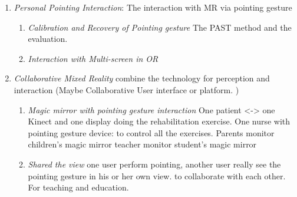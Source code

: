 \begin{enumerate}
	\item
		\emph{Personal Pointing Interaction}: The interaction with MR via pointing gesture
		\begin{enumerate}
			\item \emph{Calibration and Recovery of Pointing gesture} The PAST method and the evaluation. 
			\item \emph{Interaction with Multi-screen in OR} 
		\end{enumerate}
	\item \emph{Collaborative Mixed Reality} combine the technology for perception and interaction (Maybe Collaborative User interface or platform. )
		\begin{enumerate}
			\item \emph{Magic mirror with pointing gesture interaction} One patient <-> one Kinect and one display  doing the rehabilitation exercise.
			One nurse with pointing gesture device: to control all the exercises. 
			Parents monitor children’s magic mirror  teacher monitor student’s magic mirror 
			\item \emph{Shared the view} one user perform pointing, another user really see the pointing gesture in his or her own view. to collaborate with each other. For teaching and education. 
		\end{enumerate}
\end{enumerate}





